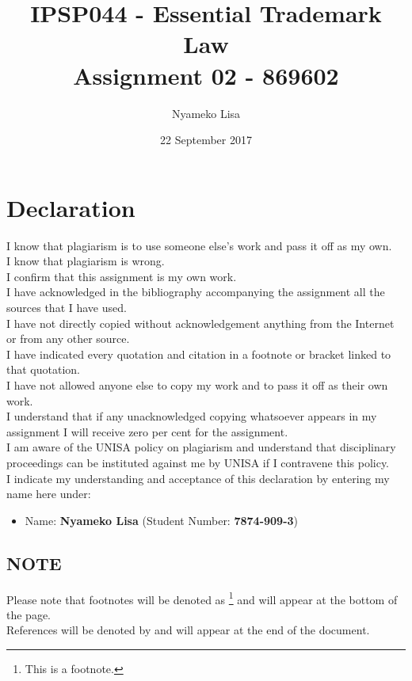 \documentclass[11pt]{article}
\author{Nyameko Lisa}
\date{22 September 2017}
\title{IPSP044 - Essential Trademark Law\\\medskip
\large Assignment 02 - 869602}
\begin{document}
\maketitle
\addvspace{110pt}

\justifying
\addvspace{110pt}
\section*{Declaration}
\label{sec:org3ef4e75}
I know that plagiarism is to use someone else’s work and pass it off as my own.\\
I know that plagiarism is wrong.\\
I confirm that this assignment is my own work.\\
I have acknowledged in the bibliography accompanying the assignment all the sources that I have used.\\
I have not directly copied without acknowledgement anything from the Internet or from any other source.\\
I have indicated every quotation and citation in a footnote or bracket linked to that quotation.\\
I have not allowed anyone else to copy my work and to pass it off as their own work.\\
I understand that if any unacknowledged copying whatsoever appears in my assignment I will receive zero per cent for the assignment.\\
I am aware of the UNISA policy on plagiarism and understand that disciplinary proceedings can be instituted against me by UNISA if I contravene this policy.\\
I indicate my understanding and acceptance of this declaration by
entering my name here under:
\begin{itemize}
\item Name: \textbf{Nyameko Lisa} (Student Number: \textbf{7874-909-3})
\end{itemize}

\subsection*{NOTE}
\label{sec:org953d6bc}
Please note that footnotes will be denoted as \footnote{This is a footnote.} and will
appear at the bottom of the page.\\
References will be denoted by \cite{rsa93_tm_act} and will appear at the end of the document.
\newpage
\end{document}
